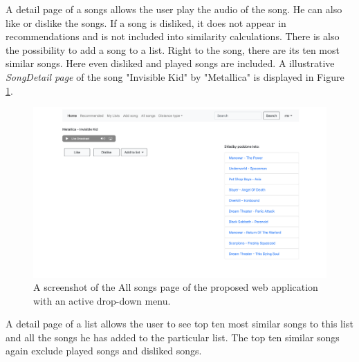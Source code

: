 A detail page of a songs allows the user play the audio of the song. He can also like or dislike the songs. If a song is disliked, it does not appear in recommendations and is not included into similarity calculations. There is also the possibility to add a song to a list.
Right to the song, there are its ten most similar songs. Here even disliked and played songs are included. A illustrative \textit{SongDetail page} of the song "Invisible Kid" by "Metallica" is displayed in Figure \ref{fig:song_detail_page}. \\
\begin{figure}[H]
    \centering
	\includegraphics[width=1\linewidth]{./img/song_detail_page.png}
	\caption{A screenshot of the All songs page of the proposed web application with an active drop-down menu.}
	\label{fig:song_detail_page}
\end{figure}
A detail page of a list allows the user to see top ten most similar songs to this list and all the songs he has added to the particular list. The top ten similar songs again exclude played songs and disliked songs. \\




